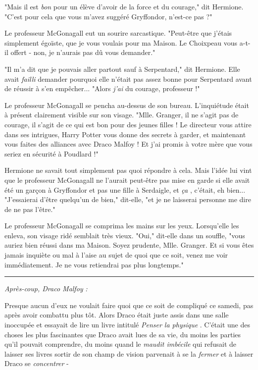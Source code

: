 "Mais il est \emph{bon}  pour un élève d'avoir de la force et du courage," dit Hermione. "C'est pour cela que vous m'avez suggéré Gryffondor, n'est-ce pas ?"

Le professeur McGonagall eut un sourire sarcastique. "Peut-être que j'étais simplement égoïste, que je vous voulais pour ma Maison. Le Choixpeau vous a-t-il offert - non, je n'aurais pas dû vous demander."

"Il m'a dit que je pouvais aller partout sauf à Serpentard," dit Hermione. Elle avait \emph{failli}  demander pourquoi elle n'était pas assez bonne pour Serpentard avant de réussir à s'en empêcher... "Alors \emph{j'ai}  du courage, professeur !"

Le professeur McGonagall se pencha au-dessus de son bureau. L'inquiétude était à présent clairement visible sur son visage. "Mlle. Granger, il ne s'agit pas de courage, il s'agit de ce qui est bon pour des jeunes filles ! Le directeur vous attire dans ses intrigues, Harry Potter vous donne des secrets à garder, et maintenant vous faites des alliances avec Draco Malfoy ! Et j'ai promis à votre mère que vous seriez en sécurité à Poudlard !"

Hermione ne savait tout simplement pas quoi répondre à cela. Mais l'idée lui vint que le professeur McGonagall ne l'aurait peut-être pas mise en garde si elle avait été un garçon à Gryffondor et pas une fille à Serdaigle, et \emph{ça} , c'était, eh bien... "J'essaierai d'être quelqu'un de bien," dit-elle, "et je ne laisserai personne me dire de ne pas l'être."

Le professeur McGonagall se comprima les mains sur les yeux. Lorsqu'elle les enleva, son visage ridé semblait très vieux. "Oui," dit-elle dans un souffle, "vous auriez bien réussi dans ma Maison. Soyez prudente, Mlle. Granger. Et si vous êtes jamais inquiète ou mal à l'aise au sujet de quoi que ce soit, venez me voir immédiatement. Je ne vous retiendrai pas plus longtemps."
\par\noindent\rule{\textwidth}{0.4pt}
\emph{Après-coup, Draco Malfoy}  \emph{:} 

Presque aucun d'eux ne voulait faire quoi que ce soit de compliqué ce samedi, pas après avoir combattu plus tôt. Alors Draco était juste assis dans une salle inoccupée et essayait de lire un livre intitulé \emph{Penser la physique} . C'était une des choses les plus fascinantes que Draco avait lues de sa vie, du moins les parties qu'il pouvait comprendre, du moins quand le \emph{maudit imbécile}  qui refusait de laisser ses livres sortir de son champ de vision parvenait à se la \emph{fermer}  et à laisser Draco se \emph{concentrer}  -

